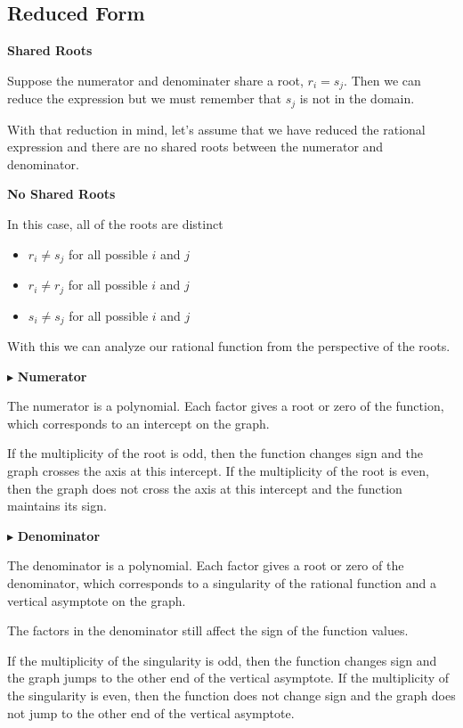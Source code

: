 \documentclass{ximera}
\begin{document}
\subsection*{Reduced Form}

\textbf{Shared Roots}

Suppose the numerator and denominater share a root, $r_i = s_j$.  Then we can reduce the expression but we must remember that $s_j$ is not in the domain.


With that reduction in mind, let's assume that we have reduced the rational expression and there are no shared roots between the numerator and denominator. 




\textbf{No Shared Roots}

In this case, all of the roots are distinct

\begin{itemize}
\item $r_i \ne s_j$ for all possible $i$ and $j$
\item $r_i \ne r_j$ for all possible $i$ and $j$
\item $s_i \ne s_j$ for all possible $i$ and $j$
\end{itemize}


With this we can analyze our rational function from the perspective of the roots.



$\blacktriangleright$ \textbf{Numerator}



The numerator is a polynomial.  Each factor gives a root or zero of the function, which corresponds to an intercept on the graph. 

If the multiplicity of the root is odd, then the function changes sign and the graph crosses the axis at this intercept.  
If the multiplicity of the root is even, then the graph does not cross the axis at this intercept and the function maintains its sign. 






$\blacktriangleright$ \textbf{Denominator}


The denominator is a polynomial.  Each factor gives a root or zero of the denominator, which corresponds to a singularity of the rational function and a vertical asymptote on the graph. 


The factors in the denominator still affect the sign of the function values.


If the multiplicity of the singularity is odd, then the function changes sign and the graph jumps to the other end of the vertical asymptote.  
If the multiplicity of the singularity is even, then the function does not change sign and the graph does not jump to the other end of the vertical asymptote. 
\end{document}
